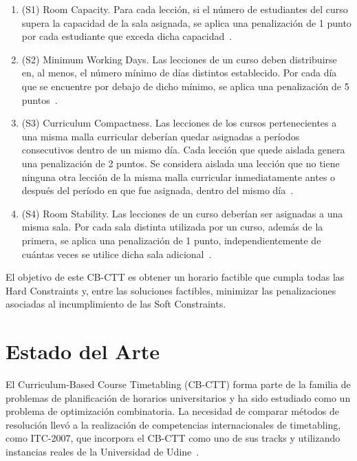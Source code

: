 \documentclass[letter, 10pt]{article}
\begin{document}
\begin{enumerate}
    \item (S1) Room Capacity. Para cada lecci\'on, si el n\'umero de estudiantes del curso supera la capacidad de la sala asignada, se aplica una penalizaci\'on de 1 punto por cada estudiante que exceda dicha capacidad~\cite{Bonutti2012Benchmarking,DiGaspero2007ITC}.
    
    \item (S2) Minimum Working Days. Las lecciones de un curso deben distribuirse en, al menos, el n\'umero m\'inimo de d\'ias distintos establecido. Por cada d\'ia que se encuentre por debajo de dicho m\'inimo, se aplica una penalizaci\'on de 5 puntos~\cite{Bonutti2012Benchmarking,Hao2011LowerBounds,DiGaspero2007ITC}.
    
    \item (S3) Curriculum Compactness. Las lecciones de los cursos pertenecientes a una misma malla curricular deber\'ian quedar asignadas a per\'iodos consecutivos dentro de un mismo d\'ia. Cada lecci\'on que quede aislada genera una penalizaci\'on de 2 puntos. Se considera aislada una lecci\'on que no tiene ninguna otra lecci\'on de la misma malla curricular inmediatamente antes o despu\'es del per\'iodo en que fue asignada, dentro del mismo d\'ia~\cite{Bonutti2012Benchmarking,Hao2011LowerBounds,Ceschia2023Educational,DiGaspero2007ITC}.
    
    \item (S4) Room Stability. Las lecciones de un curso deber\'ian ser asignadas a una misma sala. Por cada sala distinta utilizada por un curso, adem\'as de la primera, se aplica una penalizaci\'on de 1 punto, independientemente de cu\'antas veces se utilice dicha sala adicional~\cite{Bonutti2012Benchmarking,Hao2011LowerBounds,Ceschia2023Educational,DiGaspero2007ITC}.
\end{enumerate}

El objetivo de este CB-CTT es obtener un horario factible que cumpla todas las Hard Constraints y, entre las soluciones factibles, minimizar las penalizaciones asociadas al incumplimiento de las Soft Constraints.

\section{Estado del Arte}

El Curriculum-Based Course Timetabling (CB-CTT) forma parte de la familia de problemas de planificaci\'on de horarios universitarios y ha sido estudiado como un problema de optimizaci\'on combinatoria. La necesidad de comparar m\'etodos de resoluci\'on llev\'o a la realizaci\'on de competencias internacionales de timetabling, como ITC-2007, que incorpora el CB-CTT como uno de sus tracks y utilizando instancias reales de la Universidad de Udine~\cite{Ceschia2023Educational,DiGaspero2007ITC}.
\end{document}
